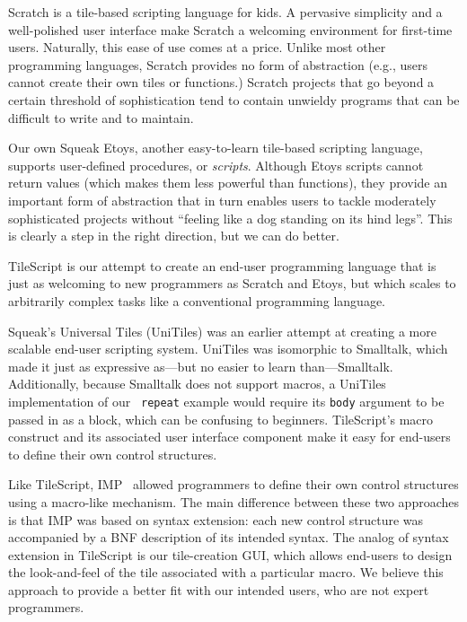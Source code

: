 \label{sec:related}

Scratch is a tile-based scripting language for kids. A pervasive simplicity and a well-polished user interface make Scratch a welcoming environment for first-time users.
Naturally, this ease of use comes at a price.  Unlike most other programming languages, Scratch
provides no form of abstraction (e.g., users cannot create their own tiles or functions.) Scratch projects that go beyond a certain threshold of
sophistication tend to contain unwieldy programs that can be difficult to write and to maintain.


Our own Squeak Etoys, another easy-to-learn tile-based scripting language, supports user-defined
procedures, or {\em scripts}. Although Etoys scripts cannot return values (which makes them less powerful than
functions), they provide an important form of abstraction that in turn enables users to tackle moderately
sophisticated projects without ``feeling like a dog standing on its hind legs''. This is clearly a step in
the right direction, but we can do better.

TileScript is our attempt to create an end-user programming language that is just as welcoming to new programmers as
Scratch and Etoys, but which scales to arbitrarily complex tasks like a conventional programming language.

Squeak's Universal Tiles (UniTiles) was an earlier attempt at creating a more scalable end-user scripting system.
UniTiles was isomorphic to Smalltalk, which made it just as expressive as---but no easier to
learn than---Smalltalk. Additionally, because Smalltalk does not support macros, a UniTiles implementation of our {\tt
repeat} example would require its {\tt body} argument to be passed in as a block, which can be confusing to beginners.
TileScript's macro construct and its associated user interface component make it easy for end-users to define their own
control structures.

Like TileScript, IMP~\cite{i70imp} allowed programmers to define their own control structures using a macro-like mechanism.
The main difference between these two approaches is that IMP was based on syntax extension: each new control structure
was accompanied by a BNF description of its intended syntax. The analog of syntax extension in TileScript is our
tile-creation GUI, which allows end-users to design the look-and-feel of the tile associated with a particular macro. We
believe this approach to provide a better fit with our intended users, who are not expert programmers.
